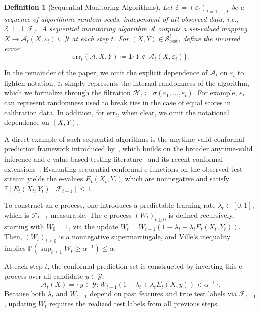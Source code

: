 \documentclass{uai2026} %
\newtheorem{definition}[theorem]{Definition}
\newcommand{\1}{\mathbf{1}}
\newcommand{\ind}[1]{\mathbf{1}\{#1\}}
\newcommand{\prob}{\mathbb{P}}
\newcommand{\expec}{\mathbb{E}}
\newcommand{\test}{\mathrm{test}}
\newcommand{\ycal}{\mathcal{Y}}
\newcommand{\scal}{\mathcal{S}}
\renewcommand{\epsilon}{\varepsilon}
\newcommand{\eqdef}{\coloneqq}
\newcommand{\ecal}{\mathcal{E}}
\newcommand{\err}{\mathrm{err}}
\newcommand{\indep}{\perp \!\!\! \perp}
\newcommand{\F}{\mathcal{F}}
\newcommand{\scaltest}{\scal_{\test}}
\newcommand{\acal}{\mathcal{A}}
\begin{document}
\begin{definition}[Sequential Monitoring Algorithms]
  Let $\ecal = (\epsilon_t)_{t=1,\ldots,T}$ be a sequence of algorithmic random seeds, independent of all observed data, i.e.,  $\ecal \indep \F_T$. A sequential monitoring algorithm $\acal$ outputs a set-valued mapping $X \to \acal_t(X, \epsilon_t) \subseteq \ycal$ at each step $t$. For $(X, Y) \in \scaltest^t$, define the incurred error
  \begin{equation*}
    \err_t(\acal, X, Y) \eqdef \ind{Y \not\in \acal_t(X,\epsilon_t)}.
  \end{equation*}
\end{definition}

In the remainder of the paper, we omit the explicit dependence of $\acal_t$ on $\epsilon_t$ to lighten notation; $\epsilon_t$ simply represents the internal randomness of the algorithm, which we formalize through the filtration $\mathcal{H}_t \eqdef \sigma(\epsilon_1, \dots, \epsilon_t)$. For example, $\epsilon_t$ can represent randomness used to break ties in the case of equal scores in calibration data. In addition, for $\err_t$, when clear, we omit the notational dependence on $(X,Y)$.

A direct example of such sequential algorithms is the anytime-valid conformal prediction framework introduced by~\citet{gauthier2025values}, which builds on the broader anytime-valid inference and e-value based testing literature~\citep{grunwald2020safe,vovk2021values,ramdas2023game,howard2021time} and its recent conformal extensions~\citep{vovk2025conformal,balinsky2024enhancing}.
Evaluating sequential conformal e-functions on the observed test stream yields the e-values $E_t(X_t, Y_t)$ which are nonnegative and satisfy $\expec[E_t(X_t, Y_t) \mid \F_{t-1}] \le 1$.

To construct an e-process, one introduces a predictable learning rate $\lambda_t \in [0,1]$, which is $\F_{t-1}$-measurable\citep{waudby2025universal}. The e-process $(W_t)_{t\ge 0}$ is defined recursively, starting with $W_0=1$, via the update $W_t = W_{t-1} \left(1 - \lambda_t + \lambda_t E_t(X_t, Y_t)\right)$. Then, $(W_t)_{t \ge 0}$ is a nonnegative supermartingale, and Ville's inequality~\citep{ville1939etude} implies $\prob\left(\sup_{t\ge 1} W_t\ge \alpha^{-1}\right)\le \alpha.$

At each step $t$, the conformal prediction set is constructed by inverting this e-process over all candidate $y \in \ycal$:
\begin{equation*}
  \acal_t(X) = \{y \in \ycal \colon W_{t-1} (1 - \lambda_t + \lambda_t E_t(X, y)) < \alpha^{-1}\}.
\end{equation*}
Because both $\lambda_t$ and $W_{t-1}$ depend on past features and true test labels via $\F_{t-1}$, updating $W_t$ requires the realized test labels from all previous steps.
\end{document}
